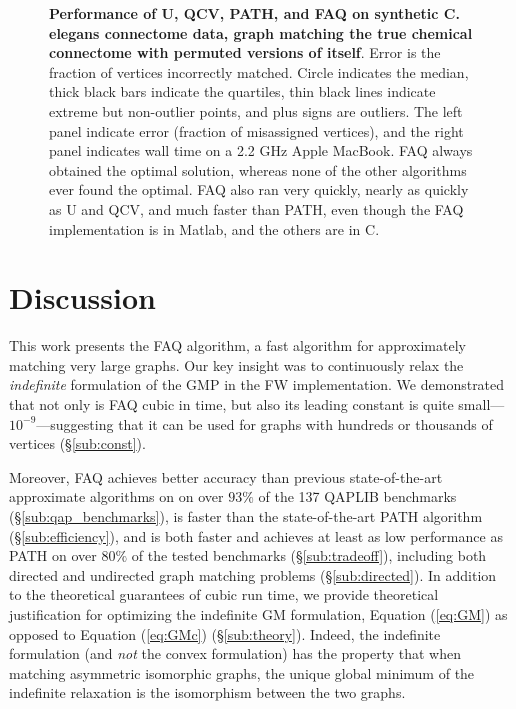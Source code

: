 \documentclass[10pt]{article}
\begin{document}
\begin{figure}[h!]
	\centering
	\caption{{\bf Performance of U, QCV, PATH, and FAQ on synthetic C. elegans connectome data, graph matching the true chemical connectome with permuted versions of itself}.  Error is the fraction of vertices incorrectly matched.  Circle indicates the median, thick black bars indicate the quartiles, thin black lines indicate extreme but non-outlier points, and plus signs are outliers. The left panel indicate error (fraction of misassigned vertices), and the right panel indicates wall time on a 2.2 GHz Apple MacBook.   FAQ always obtained the optimal solution, whereas none of the other algorithms ever found the optimal.  FAQ also ran very quickly, nearly as quickly as U and QCV, and much faster than PATH, even though the FAQ implementation is in Matlab, and the others are in C.}
	\label{fig:connectomes}
\end{figure}

\section{Discussion}
\label{sec:discussion}

This work presents the FAQ algorithm, a fast algorithm for approximately matching very large graphs.  Our key insight was to continuously relax the {\it indefinite} formulation of the GMP in the FW implementation.
We demonstrated that not only is FAQ cubic in time, but also its leading constant is quite small---$10^{-9}$---suggesting that it can be used for graphs with hundreds or thousands of vertices (\S \ref{sub:const}).  

Moreover, FAQ achieves better accuracy than previous state-of-the-art approximate algorithms on on over $93\%$ of the 137 QAPLIB benchmarks (\S \ref{sub:qap_benchmarks}), is faster than the state-of-the-art PATH algorithm (\S \ref{sub:efficiency}), and is both faster and achieves at least as low performance as PATH on over $80\%$ of the tested benchmarks (\S \ref{sub:tradeoff}),  including both directed and undirected graph matching problems (\S \ref{sub:directed}).  
In addition to the theoretical guarantees of cubic run time, we provide theoretical justification for optimizing the indefinite GM formulation, Equation (\ref{eq:GM}) as opposed to Equation (\ref{eq:GMc}) (\S \ref{sub:theory}).  Indeed, the indefinite formulation (and {\it not} the convex formulation) has the property that when matching asymmetric isomorphic graphs, the unique global minimum of the indefinite relaxation is the isomorphism between the two graphs.  
\end{document}
